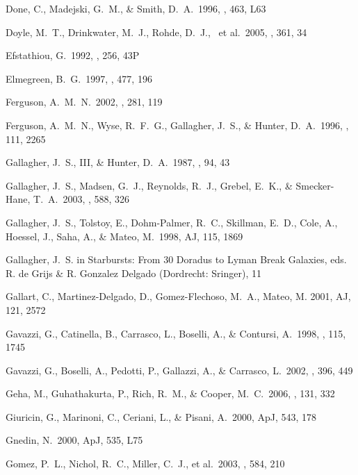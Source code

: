 \documentclass[12pt,onecolumn]{emulateapj}
\begin{document}
\begin{thebibliography}{}
Done, C., Madejski, G.~M., \& Smith, D.~A.\ 1996, \apj, 463, L63 

Doyle, M.~T., Drinkwater, M.~J., Rohde, D.~J., ~et al.\ 2005, \mnras, 361, 34 

Efstathiou, G.\ 1992, \mnras, 256, 43P 

Elmegreen, B.~G.\ 1997, \apj, 477, 196 

Ferguson, A.~M.~N.\ 2002, \apss, 281, 119 

Ferguson, A.~M.~N., Wyse, R.~F.~G., Gallagher, J.~S., \& Hunter, D.~A.\ 
1996, \aj, 111, 2265 

Gallagher, J.~S., III, \& Hunter, D.~A.\ 1987, \aj, 94, 43 

Gallagher, J.~S., Madsen, G.~J., Reynolds, R.~J., Grebel, E.~K., 
\& Smecker-Hane, T.~A.\ 2003, \apj, 588, 326 

Gallagher, J.~S., Tolstoy, E., Dohm-Palmer, R.~C., Skillman, E.~D., Cole, A., 
Hoessel, J., Saha, A., \& Mateo, M.\ 1998, AJ, 115, 1869

Gallagher, J.~S. in Starbursts: From 30 Doradus to Lyman Break Galaxies,
eds. R. de Grijs \& R. Gonzalez Delgado (Dordrecht: Sringer), 11

Gallart, C., Martinez-Delgado, D., Gomez-Flechoso, M.~A., Mateo, M. 2001, AJ, 121, 2572

Gavazzi, G., Catinella, B., Carrasco, L., Boselli, A., \& Contursi, A.\ 
1998, \aj, 115, 1745 

Gavazzi, G., Boselli, A., Pedotti, P., Gallazzi, A., \& Carrasco, L.\ 
2002, \aap, 396, 449 

\bibitem[Geha et al.(2006)]{ggrc06} 
Geha, M., Guhathakurta, P., Rich, R.~M., \& Cooper, M.~C.\ 2006, \aj, 131, 332 

Giuricin, G., Marinoni, C., Ceriani, L., \& Pisani, A.\ 2000, ApJ, 543, 178

\bibitem[Gnedin (2000)]{g00}
Gnedin, N.\ 2000, ApJ, 535, L75

Gomez, P.~L., Nichol, R.~C., Miller, C.~J., et al.\ 2003, \apj, 584, 210


\end{thebibliography}
\end{document}

